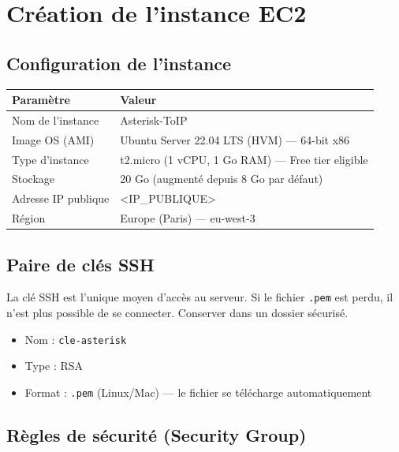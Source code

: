 \documentclass[a4paper,11pt]{report}
\begin{document}
\section{Création de l'instance EC2}

\subsection{Configuration de l'instance}

\begin{center}
\begin{tabularx}{\textwidth}{lX}
\toprule
\rowcolor{primarylight}\textbf{Paramètre} & \textbf{Valeur}\\
\midrule
Nom de l'instance & Asterisk-ToIP\\
Image OS (AMI) & Ubuntu Server 22.04 LTS (HVM) — 64-bit x86\\
Type d'instance & t2.micro (1 vCPU, 1 Go RAM) — Free tier eligible\\
Stockage & 20 Go (augmenté depuis 8 Go par défaut)\\
Adresse IP publique & <IP_PUBLIQUE>\\
Région & Europe (Paris) — eu-west-3\\
\bottomrule
\end{tabularx}
\end{center}

\subsection{Paire de clés SSH}

\begin{dangerbox}
La clé SSH est l'unique moyen d'accès au serveur. Si le fichier \texttt{.pem} est perdu, il n'est plus possible de se connecter. Conserver dans un dossier sécurisé.
\end{dangerbox}

\begin{itemize}[leftmargin=1.4em, itemsep=2pt]
  \item Nom : \texttt{cle-asterisk}
  \item Type : RSA
  \item Format : \texttt{.pem} (Linux/Mac) — le fichier se télécharge automatiquement
\end{itemize}

\subsection{Règles de sécurité (Security Group)}
\end{document}
